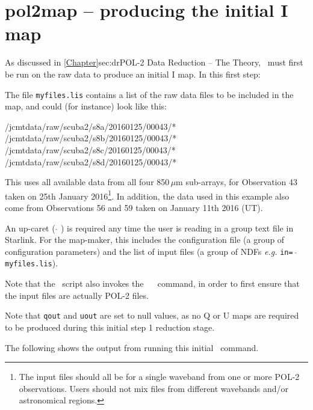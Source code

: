\section{pol2map -- producing the initial I map}
\label{sec:how-step1}

As discussed in \cref{Chapter}{sec:dr}{POL-2 Data Reduction -- The
  Theory}, \poltwomap\ must first be run on the raw data to produce an
initial I map.  In this first step:

\begin{terminalv}
\end{terminalv}

The file \texttt{myfiles.lis} contains a list of the raw data
files to be included in the map, and could (for instance) look like
this:

\begin{terminalv}
/jcmtdata/raw/scuba2/s8a/20160125/00043/*
/jcmtdata/raw/scuba2/s8b/20160125/00043/*
/jcmtdata/raw/scuba2/s8c/20160125/00043/*
/jcmtdata/raw/scuba2/s8d/20160125/00043/*
\end{terminalv}

This uses all available data from all four 850\,$\mu$m sub-arrays, for
Observation 43 taken on 25th January 2016\footnote{The input files
  should all be for a single waveband from one or more POL-2
  observations. Users should not mix files from different wavebands and/or
  astronomical regions.}. In addition, the data used in this example
also come from Observations 56 and 59 taken on January 11th 2016 (UT).

\begin{tip}
  An up-caret ( $ \hat{} $ ) is required any time the user is reading in
  a group text file in Starlink. For the map-maker, this includes the
  configuration file (a group of configuration parameters) and the
  list of input files (a group of NDFs \emph{e.g.} \texttt{in= $
    \hat{} $ myfiles.lis}).

  Note that the \poltwomap\ script also invokes the \ \smurf\
   command, in order to 
  first ensure that the input files are actually POL-2 files.
\end{tip}

Note that \texttt{qout} and \texttt{uout} are set to null values, as no
Q or U maps are required to be produced during this initial step 1
reduction stage.

The following shows the output from running this initial \poltwomap\
command.

